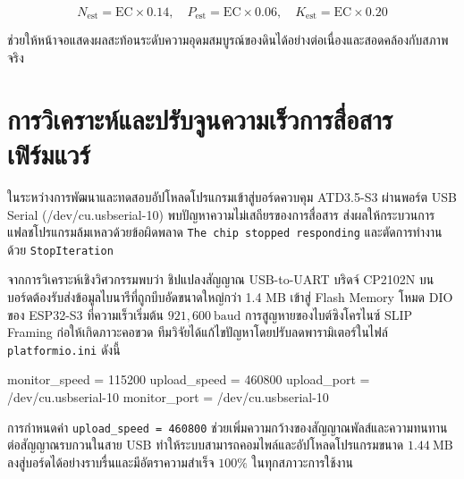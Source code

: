 \begin{equation}
    N_{\text{est}} = \text{EC} \times 0.14, \quad P_{\text{est}} = \text{EC} \times 0.06, \quad K_{\text{est}} = \text{EC} \times 0.20
    \label{eq:ec_fallback}
\end{equation}

ช่วยให้หน้าจอแสดงผลสะท้อนระดับความอุดมสมบูรณ์ของดินได้อย่างต่อเนื่องและสอดคล้องกับสภาพจริง

\section{การวิเคราะห์และปรับจูนความเร็วการสื่อสารเฟิร์มแวร์}

ในระหว่างการพัฒนาและทดสอบอัปโหลดโปรแกรมเข้าสู่บอร์ดควบคุม ATD3.5-S3 ผ่านพอร์ต USB Serial (/dev/cu.usbserial-10) พบปัญหาความไม่เสถียรของการสื่อสาร ส่งผลให้กระบวนการแฟลชโปรแกรมล้มเหลวด้วยข้อผิดพลาด \texttt{The chip stopped responding} และตัดการทำงานด้วย \texttt{StopIteration}

จากการวิเคราะห์เชิงวิศวกรรมพบว่า ชิปแปลงสัญญาณ USB-to-UART บริดจ์ CP2102N บนบอร์ดต้องรับส่งข้อมูลไบนารีที่ถูกบีบอัดขนาดใหญ่กว่า 1.4 MB เข้าสู่ Flash Memory โหมด DIO ของ ESP32-S3 ที่ความเร็วเริ่มต้น $921,600\ \text{baud}$ การสูญหายของไบต์ซิงโครไนซ์ SLIP Framing ก่อให้เกิดภาวะคอขวด ทีมวิจัยได้แก้ไขปัญหาโดยปรับลดพารามิเตอร์ในไฟล์ \texttt{platformio.ini} ดังนี้

\begin{pythonbox}
monitor_speed = 115200
upload_speed = 460800
upload_port = /dev/cu.usbserial-10
monitor_port = /dev/cu.usbserial-10
\end{pythonbox}

การกำหนดค่า \texttt{upload\_speed = 460800} ช่วยเพิ่มความกว้างของสัญญาณพัลส์และความทนทานต่อสัญญาณรบกวนในสาย USB ทำให้ระบบสามารถคอมไพล์และอัปโหลดโปรแกรมขนาด $1.44\ \text{MB}$ ลงสู่บอร์ดได้อย่างราบรื่นและมีอัตราความสำเร็จ $100\%$ ในทุกสภาวะการใช้งาน

